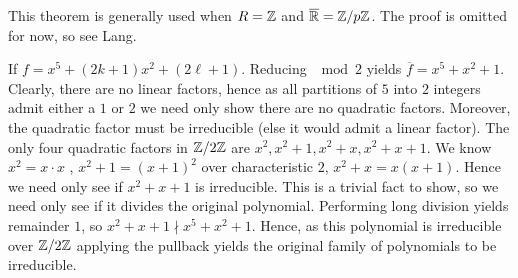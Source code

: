 This theorem is generally used when \(R = \mathbb{Z}\) and \(\overline{\mathbb{R}} = \mathbb{Z} / p\mathbb{Z}\). The proof is omitted for now, so see Lang.
\begin{example}
	If \(f = x^{5} + \left( 2k+1 \right) x^2 + \left( 2\ell +1 \right) \). Reducing \(\mod 2\) yields \(\overline{f} = x^{5} + x^2 + 1\). Clearly, there are no linear factors, hence as all partitions of \(5\) into \(2\) integers admit either a \(1\) or \(2\) we need only show there are no quadratic factors. Moreover, the quadratic factor must be irreducible (else it would admit a linear factor). The only four quadratic factors in \(\mathbb{Z} / 2\mathbb{Z}\) are \(x^2, x^2 + 1, x^2 + x, x^2 + x + 1\). We know \(x^2 = x \cdot x\) , \(x^2 + 1 = \left( x+1 \right) ^2\) over characteristic \(2\), \(x^2 + x = x \left( x + 1 \right) \). Hence we need only see if \(x^2 + x + 1\) is irreducible. This is a trivial fact to show, so we need only see if it divides the original polynomial. Performing long division yields remainder \(1\), so \(x^2 + x + 1 \nmid x^{5} + x^2 + 1\). Hence, as this polynomial is irreducible over \(\mathbb{Z} / 2\mathbb{Z}\) applying the pullback yields the original family of polynomials to be irreducible.
\end{example}
